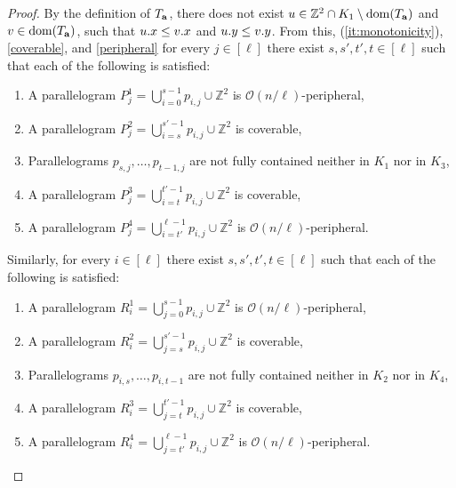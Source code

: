 \documentclass[twoside,leqno]{article}
\newcommand{\Z}{\mathbb{Z}}
\renewcommand{\O}{\mathcal{O}}
\begin{document}
\begin{proof}
By the definition of $T_\mathbf{a}$, there does not exist $u \in \Z^2 \cap K_1 \setminus \d{\Ta}$ and $v \in \operatorname*{dom}(T_\mathbf{a})$, such that $u.x \le v.x$ and $u.y \le v.y$. From this, (\ref{it:monotonicity}), \cref{coverable}, and \cref{peripheral} for every $j \in [\ell]$ there exist $s,s', t',t \in [\ell]$  such that each of the following is satisfied:
\begin{enumerate}
	\item A parallelogram $P_j^1 = \bigcup_{i=0}^{s-1} p_{i, j} \cup \Z^2$ is $\O(n/\ell)$-peripheral,
	\item A parallelogram $P_j^2 = \bigcup_{i=s}^{s'-1} p_{i, j} \cup \Z^2$ is coverable, 
	\item Parallelograms $p_{s, j}, \dots, p_{t - 1, j}$ are not fully contained neither in $K_1$ nor in $K_3$,
	\item A parallelogram $P_j^3 = \bigcup_{i=t}^{t'-1} p_{i, j} \cup \Z^2$ is coverable,
	\item A parallelogram $P_j^4 = \bigcup_{i=t'}^{\ell - 1} p_{i, j} \cup \Z^2$ is $\O(n/\ell)$-peripheral.
\end{enumerate}

\noindent Similarly, for every $i \in [\ell]$ there exist $s,s', t',t \in [\ell]$  such that each of the following is satisfied:
\begin{enumerate}
	\item A parallelogram $R_i^1 = \bigcup_{j=0}^{s-1} p_{i, j} \cup \Z^2$ is $\O(n/\ell)$-peripheral,
	\item A parallelogram $R_i^2 = \bigcup_{j=s}^{s'-1} p_{i, j} \cup \Z^2$ is coverable, 
	\item Parallelograms $p_{i, s}, \dots, p_{i, t-1}$ are not fully contained neither in $K_2$ nor in $K_4$,
	\item A parallelogram $R_i^3 = \bigcup_{j=t}^{t'-1} p_{i, j} \cup \Z^2$ is coverable,
	\item A parallelogram $R_i^4 = \bigcup_{j=t'}^{\ell - 1} p_{i, j} \cup \Z^2$ is $\O(n/\ell)$-peripheral. 
\end{enumerate}


\end{proof}
\end{document}
